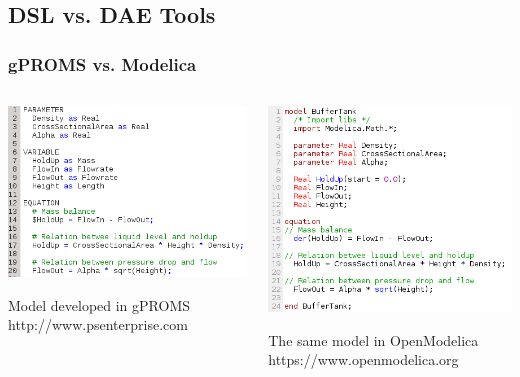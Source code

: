 \documentclass[compress,newPxFont,sthlmFooter]{beamer}
\begin{document}
\subsection{DSL vs. DAE Tools}
\begin{frame}
\frametitle{gPROMS vs. Modelica}
\begin{columns}[b]
  \begin{column}{0.5\paperwidth}
    \begin{center}
      \includegraphics[width=0.45\paperwidth]{../_static/gPROMS_model.png}
    \end{center}
    \begin{center}
      {\small Model developed in gPROMS\\
	      http://www.psenterprise.com}
    \end{center}
  \end{column}
  \begin{column}{0.5\paperwidth}
    \begin{center}
      \includegraphics[width=0.45\paperwidth]{../_static/modelica_model.png}
    \end{center}
    \begin{center}
      {\small The same model in OpenModelica\\
	      https://www.openmodelica.org}
    \end{center}
  \end{column}
\end{columns}
\end{frame}
\end{document}
